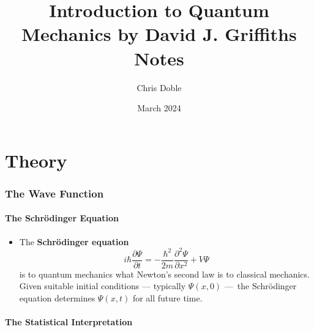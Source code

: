 \documentclass{article}
\title{Introduction to Quantum Mechanics by David J. Griffiths Notes}
\author{Chris Doble}
\date{March 2024}
\begin{document}
\maketitle

\tableofcontents

\part{Theory}

\section{The Wave Function}

\subsection{The Schrödinger Equation}

\begin{itemize}
  \item The \textbf{Schrödinger equation} \[i \hbar \frac{\partial \Psi}{\partial t} = -\frac{\hbar^2}{2 m} \frac{\partial^2 \Psi}{\partial x^2} + V \Psi\] is to quantum mechanics what Newton's second law is to classical mechanics. Given suitable initial conditions — typically $\Psi(x, 0)$ — the Schrödinger equation determines $\Psi(x, t)$ for all future time.
\end{itemize}

\subsection{The Statistical Interpretation}
\end{document}
